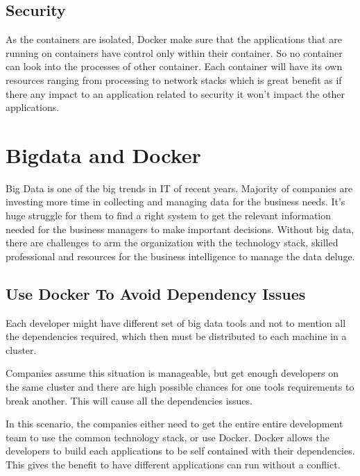 \documentclass[sigconf]{acmart}
\begin{document}
	\subsection{Security}
	
	As the containers are isolated, Docker make sure that the applications that are running on containers have control only within their container. So no container can look into the processes of other container. Each container will have its own resources ranging from processing to network stacks which is great benefit as if there any impact to an application related to security it won't impact the other applications.
	
	\cite{DockerSecurity}
	
	
	\section{Bigdata and Docker}
	
	Big Data is one of the big trends in IT of recent years. Majority of companies are investing more time in collecting and managing data for the business needs.	
	It's huge struggle for them to find a right system to get the relevant information needed for the business managers to make important decisions.	
	Without big data, there are challenges to arm the organization with the technology stack, skilled professional and resources for the business intelligence to manage the data deluge.
	\cite{bluedatablog}
	\subsection{Use Docker To Avoid Dependency Issues}
	
	Each developer might have different set of big data tools and not to mention all the dependencies required, which then must be distributed to each machine in a cluster.
	
	Companies assume this situation is manageable, but get enough developers on the same cluster and there are high possible chances for one tools requirements to break another. This will cause all the dependencies issues.
	
	In this scenario, the companies either need to get the entire entire development team to use the common technology stack, or use Docker. Docker allows the developers to build each applications to be self contained with their dependencies. This gives the benefit to have different applications can run without a conflict.\cite{AvoidDependency}
	
\end{document}

